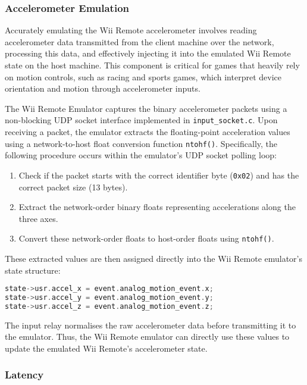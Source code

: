 \subsubsection{Accelerometer Emulation}

Accurately emulating the Wii Remote accelerometer involves reading accelerometer data transmitted from the client machine over the network, processing this data, and effectively injecting it into the emulated Wii Remote state on the host machine. This component is critical for games that heavily rely on motion controls, such as racing and sports games, which interpret device orientation and motion through accelerometer inputs.

The Wii Remote Emulator captures the binary accelerometer packets using a non-blocking UDP socket interface implemented in \texttt{input\_socket.c}. Upon receiving a packet, the emulator extracts the floating-point acceleration values using a network-to-host float conversion function \texttt{ntohf()}. Specifically, the following procedure occurs within the emulator's UDP socket polling loop:

\begin{enumerate}
	\item Check if the packet starts with the correct identifier byte (\texttt{0x02}) and has the correct packet size (13 bytes).
	\item Extract the network-order binary floats representing accelerations along the three axes.
	\item Convert these network-order floats to host-order floats using \texttt{ntohf()}.
\end{enumerate}

These extracted values are then assigned directly into the Wii Remote emulator’s state structure:

\begin{lstlisting}[language=C]
state->usr.accel_x = event.analog_motion_event.x;
state->usr.accel_y = event.analog_motion_event.y;
state->usr.accel_z = event.analog_motion_event.z;
\end{lstlisting}

The input relay normalises the raw accelerometer data before transmitting it to the emulator. Thus, the Wii Remote emulator can directly use these values to update the emulated Wii Remote’s accelerometer state.

\subsubsection{Latency}

